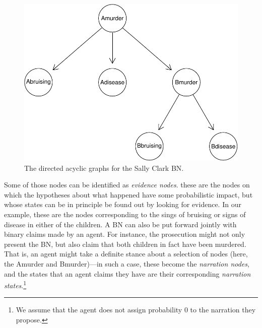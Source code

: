 \documentclass[
  10pt,
]{scrartcl}
\newcommand{\s}[1]{\textsf{#1}}
\begin{document}
\begin{figure}

\begin{center}\includegraphics[width=0.8\linewidth]{coherencePaper40_files/figure-latex/scDAG-1} \end{center}
\caption{The directed acyclic graphs for the Sally Clark BN. }
\label{fig:sc}
\end{figure}

Some of those nodes can be identified as \emph{evidence nodes}. these are the nodes on which the hypotheses about what happened have some probabilistic impact, but whose states can be in principle be found out by looking for evidence. In our example, these are the nodes corresponding to the sings of bruising or signs of disease in either of the children. A BN can also be put forward jointly with binary claims made by an agent. For instance, the prosecution might not only present the BN, but also claim that both children in fact have been murdered. That is, an agent might take a definite stance about a selection of nodes (here, the \s{Amurder} and \s{Bmurder})---in such a case, these become the \emph{narration nodes}, and the states that an agent claims they have are their corresponding \emph{narration states}.\footnote{We assume that the agent does not assign probability 0 to the narration they propose.}
\end{document}
